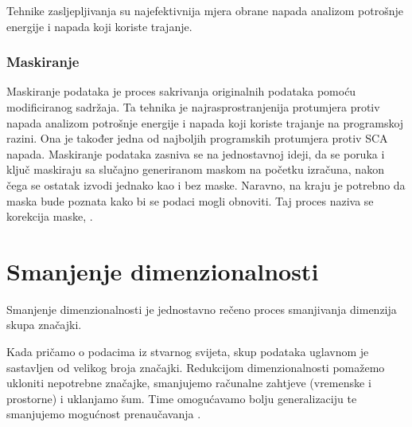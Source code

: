 \documentclass[times, utf8, diplomski]{fer}
\begin{document}
Tehnike zasljepljivanja su najefektivnija mjera obrane napada analizom potrošnje energije i napada koji koriste trajanje.

\subsection{Maskiranje}

Maskiranje podataka je proces sakrivanja originalnih podataka pomoću modificiranog sadržaja. Ta tehnika je najrasprostranjenija protumjera protiv  napada analizom potrošnje energije i napada koji koriste trajanje na programskoj razini. Ona je također jedna od najboljih programskih protumjera protiv SCA napada. Maskiranje podataka zasniva se na jednostavnoj ideji, da se poruka i ključ maskiraju sa slučajno generiranom maskom na početku izračuna, nakon čega se ostatak izvodi jednako kao i bez maske. Naravno, na kraju je potrebno da maska bude poznata kako bi se podaci mogli obnoviti. Taj proces naziva se korekcija maske, .

\chapter{Smanjenje dimenzionalnosti}

Smanjenje dimenzionalnosti  je jednostavno rečeno proces smanjivanja dimenzija skupa značajki.

Kada pričamo o podacima iz stvarnog svijeta, skup podataka uglavnom je sastavljen od velikog broja značajki. Redukcijom dimenzionalnosti pomažemo ukloniti nepotrebne značajke, smanjujemo računalne zahtjeve (vremenske i prostorne) i uklanjamo šum. Time omogućavamo bolju generalizaciju te smanjujemo mogućnost prenaučavanja .
\end{document}
